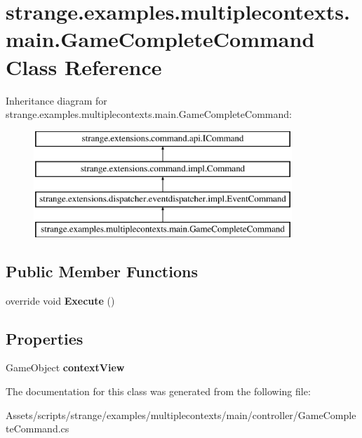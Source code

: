 \hypertarget{classstrange_1_1examples_1_1multiplecontexts_1_1main_1_1_game_complete_command}{\section{strange.\-examples.\-multiplecontexts.\-main.\-Game\-Complete\-Command Class Reference}
\label{classstrange_1_1examples_1_1multiplecontexts_1_1main_1_1_game_complete_command}
}
Inheritance diagram for strange.\-examples.\-multiplecontexts.\-main.\-Game\-Complete\-Command\-:\begin{figure}[H]
\begin{center}
\leavevmode
\includegraphics[height=4.000000cm]{classstrange_1_1examples_1_1multiplecontexts_1_1main_1_1_game_complete_command}
\end{center}
\end{figure}
\subsection*{Public Member Functions}
\begin{DoxyCompactItemize}
\item 
\hypertarget{classstrange_1_1examples_1_1multiplecontexts_1_1main_1_1_game_complete_command_a4ac72922f5a8dba145897e82546f9e72}{override void {\bfseries Execute} ()}\label{classstrange_1_1examples_1_1multiplecontexts_1_1main_1_1_game_complete_command_a4ac72922f5a8dba145897e82546f9e72}

\end{DoxyCompactItemize}
\subsection*{Properties}
\begin{DoxyCompactItemize}
\item 
\hypertarget{classstrange_1_1examples_1_1multiplecontexts_1_1main_1_1_game_complete_command_ae5b76c119861086fa3efdd4a336d243e}{Game\-Object {\bfseries context\-View}}\label{classstrange_1_1examples_1_1multiplecontexts_1_1main_1_1_game_complete_command_ae5b76c119861086fa3efdd4a336d243e}

\end{DoxyCompactItemize}


The documentation for this class was generated from the following file\-:\begin{DoxyCompactItemize}
\item 
Assets/scripts/strange/examples/multiplecontexts/main/controller/Game\-Complete\-Command.\-cs\end{DoxyCompactItemize}
